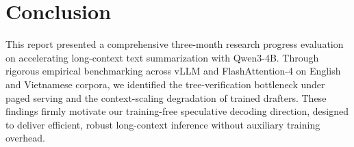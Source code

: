 \documentclass[11pt]{article}
\begin{document}
\section{Conclusion}
This report presented a comprehensive three-month research progress evaluation on accelerating long-context text summarization with Qwen3-4B. Through rigorous empirical benchmarking across vLLM and FlashAttention-4 on English and Vietnamese corpora, we identified the tree-verification bottleneck under paged serving and the context-scaling degradation of trained drafters. These findings firmly motivate our training-free speculative decoding direction, designed to deliver efficient, robust long-context inference without auxiliary training overhead.


\end{document}
